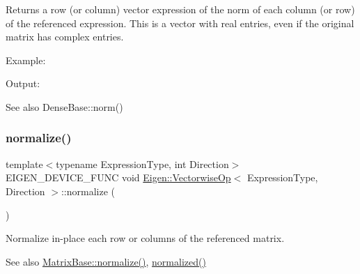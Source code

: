 \begin{DoxyReturn}{Returns}
a row (or column) vector expression of the norm of each column (or row) of the referenced expression. This is a vector with real entries, even if the original matrix has complex entries.
\end{DoxyReturn}
Example\+: 
\begin{DoxyCodeInclude}{0}
\end{DoxyCodeInclude}
 Output\+: 
\begin{DoxyVerbInclude}
\end{DoxyVerbInclude}


\begin{DoxySeeAlso}{See also}
Dense\+Base\+::norm() 
\end{DoxySeeAlso}
\mbox{\label{class_eigen_1_1_vectorwise_op_a1d22c9442537bd654edb4604db7b7b57}} 
\subsubsection{\texorpdfstring{normalize()}{normalize()}}
{\footnotesize\ttfamily template$<$typename Expression\+Type, int Direction$>$ \\
E\+I\+G\+E\+N\+\_\+\+D\+E\+V\+I\+C\+E\+\_\+\+F\+U\+NC void \mbox{\hyperlink{class_eigen_1_1_vectorwise_op}{Eigen\+::\+Vectorwise\+Op}}$<$ Expression\+Type, Direction $>$\+::normalize (\begin{DoxyParamCaption}{ }\end{DoxyParamCaption})\hspace{0.3cm}{\ttfamily [inline]}}

Normalize in-\/place each row or columns of the referenced matrix. \begin{DoxySeeAlso}{See also}
\mbox{\hyperlink{class_eigen_1_1_matrix_base_a1a2dd2fd1597ee6d51098aa3bb7c86f4}{Matrix\+Base\+::normalize()}}, \mbox{\hyperlink{class_eigen_1_1_vectorwise_op_a38799c77ec92e4b856804b7f0bc35c67}{normalized()}} 
\end{DoxySeeAlso}
\mbox{\label{class_eigen_1_1_vectorwise_op_a38799c77ec92e4b856804b7f0bc35c67}} 
